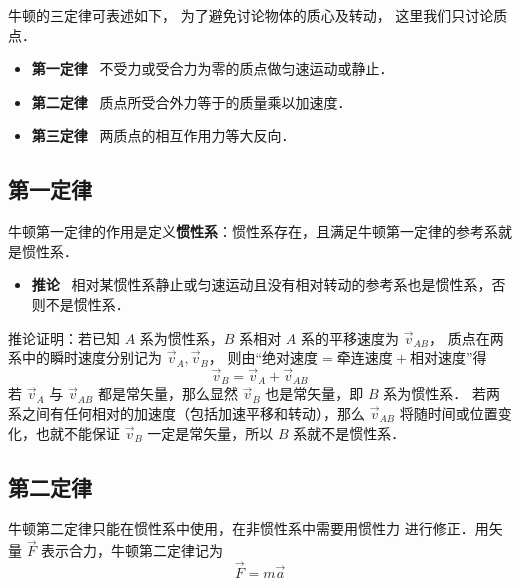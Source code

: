 

牛顿的三定律可表述如下， 为了避免讨论物体的质心及转动， 这里我们只讨论质点．
\begin{itemize}
\item \textbf{第一定律} \ 不受力或受合力为零的质点做匀速运动或静止．
\item \textbf{第二定律} \ 质点所受合外力等于的质量乘以加速度．
\item \textbf{第三定律} \ 两质点的相互作用力等大反向．
\end{itemize}

\subsection{第一定律}

牛顿第一定律的作用是定义\textbf{惯性系}：惯性系存在，且满足牛顿第一定律的参考系就是惯性系．

\begin{itemize}
\item \textbf{推论} \ 相对某惯性系静止或匀速运动且没有相对转动的参考系也是惯性系，否则不是惯性系．
\end{itemize}

推论证明：若已知 $A$ 系为惯性系，$B$ 系相对 $A$ 系的平移速度为 $\vec v_{AB}$， 质点在两系中的瞬时速度分别记为 $\vec v_A, \vec v_B$， 则由“$\text{绝对速度} = \text{牵连速度} + \text{相对速度}$”得
\begin{equation}
\vec v_{B} = \vec v_{A} + \vec v_{AB}
\end{equation}
若 $\vec v_{A}$ 与 $\vec v_{AB}$ 都是常矢量，那么显然 $\vec v_{B}$ 也是常矢量，即 $B$ 系为惯性系． 若两系之间有任何相对的加速度（包括加速平移和转动），那么 $\vec v_{AB}$ 将随时间或位置变化，也就不能保证 $\vec v_B$ 一定是常矢量，所以 $B$ 系就不是惯性系．


\subsection{第二定律}
牛顿第二定律只能在惯性系中使用，在非惯性系中需要用惯性力 进行修正．用矢量 $\vec F$ 表示合力，牛顿第二定律记为
\begin{equation}\label{New3_eq1}
\vec F = m\vec a
\end{equation}

